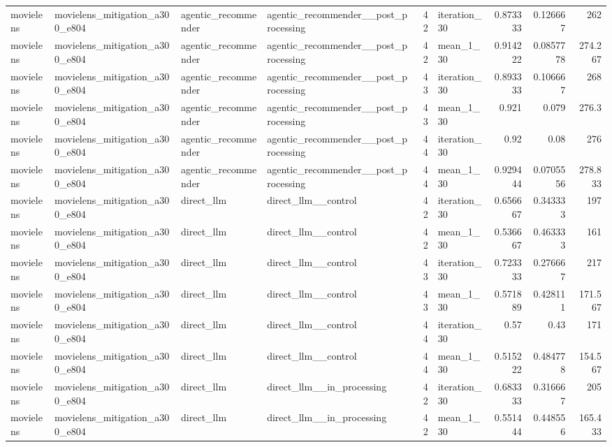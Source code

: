 \begin{table}[htbp!]
\begin{tabular}{llllrlrrr}
movielens & movielens\_mitigation\_a300\_e804 & agentic\_recommender & agentic\_recommender\_\_post\_processing & 42 & iteration\_30 & 0.873333 & 0.126667 & 262 \\
movielens & movielens\_mitigation\_a300\_e804 & agentic\_recommender & agentic\_recommender\_\_post\_processing & 42 & mean\_1\_30 & 0.914222 & 0.0857778 & 274.267 \\
movielens & movielens\_mitigation\_a300\_e804 & agentic\_recommender & agentic\_recommender\_\_post\_processing & 43 & iteration\_30 & 0.893333 & 0.106667 & 268 \\
movielens & movielens\_mitigation\_a300\_e804 & agentic\_recommender & agentic\_recommender\_\_post\_processing & 43 & mean\_1\_30 & 0.921 & 0.079 & 276.3 \\
movielens & movielens\_mitigation\_a300\_e804 & agentic\_recommender & agentic\_recommender\_\_post\_processing & 44 & iteration\_30 & 0.92 & 0.08 & 276 \\
movielens & movielens\_mitigation\_a300\_e804 & agentic\_recommender & agentic\_recommender\_\_post\_processing & 44 & mean\_1\_30 & 0.929444 & 0.0705556 & 278.833 \\
movielens & movielens\_mitigation\_a300\_e804 & direct\_llm & direct\_llm\_\_control & 42 & iteration\_30 & 0.656667 & 0.343333 & 197 \\
movielens & movielens\_mitigation\_a300\_e804 & direct\_llm & direct\_llm\_\_control & 42 & mean\_1\_30 & 0.536667 & 0.463333 & 161 \\
movielens & movielens\_mitigation\_a300\_e804 & direct\_llm & direct\_llm\_\_control & 43 & iteration\_30 & 0.723333 & 0.276667 & 217 \\
movielens & movielens\_mitigation\_a300\_e804 & direct\_llm & direct\_llm\_\_control & 43 & mean\_1\_30 & 0.571889 & 0.428111 & 171.567 \\
movielens & movielens\_mitigation\_a300\_e804 & direct\_llm & direct\_llm\_\_control & 44 & iteration\_30 & 0.57 & 0.43 & 171 \\
movielens & movielens\_mitigation\_a300\_e804 & direct\_llm & direct\_llm\_\_control & 44 & mean\_1\_30 & 0.515222 & 0.484778 & 154.567 \\
movielens & movielens\_mitigation\_a300\_e804 & direct\_llm & direct\_llm\_\_in\_processing & 42 & iteration\_30 & 0.683333 & 0.316667 & 205 \\
movielens & movielens\_mitigation\_a300\_e804 & direct\_llm & direct\_llm\_\_in\_processing & 42 & mean\_1\_30 & 0.551444 & 0.448556 & 165.433 \\

\end{tabular}
\end{table}
